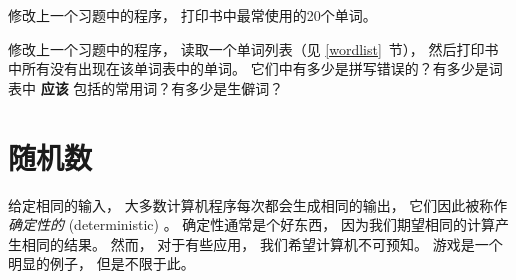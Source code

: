 \begin{exercise}

修改上一个习题中的程序， 打印书中最常使用的20个单词。  
\end{exercise}

\begin{exercise}

修改上一个习题中的程序， 读取一个单词列表（见 \ref{wordlist}~节）， 
然后打印书中所有没有出现在该单词表中的单词。  
它们中有多少是拼写错误的？有多少是词表中 {\bf 应该} 包括的常用词？有多少是生僻词？
\end{exercise}

\section{随机数}


给定相同的输入， 大多数计算机程序每次都会生成相同的输出， 
它们因此被称作 {\em 确定性的} (deterministic) 。  
确定性通常是个好东西， 因为我们期望相同的计算产生相同的结果。  
然而， 对于有些应用， 我们希望计算机不可预知。  
游戏是一个明显的例子， 但是不限于此。  


